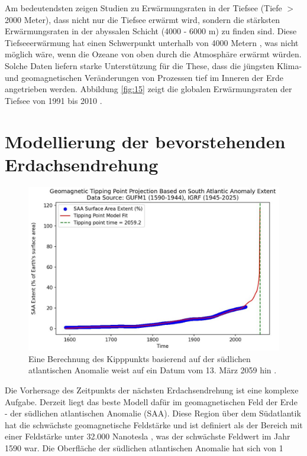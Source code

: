 \documentclass[10pt,twocolumn,letterpaper]{article}
\begin{document}
Am bedeutendsten zeigen Studien zu Erwärmungsraten in der Tiefsee (Tiefe $>$2000 Meter), dass nicht nur die Tiefsee erwärmt wird, sondern die stärksten Erwärmungsraten in der abyssalen Schicht (4000 - 6000 m) zu finden sind. Diese Tiefseeerwärmung hat einen Schwerpunkt unterhalb von 4000 Metern \cite{132,129}, was nicht möglich wäre, wenn die Ozeane von oben durch die Atmosphäre erwärmt würden. Solche Daten liefern starke Unterstützung für die These, dass die jüngsten Klima- und geomagnetischen Veränderungen von Prozessen tief im Inneren der Erde angetrieben werden. Abbildung \ref{fig:15} zeigt die globalen Erwärmungsraten der Tiefsee von 1991 bis 2010 \cite{132}.

\section{Modellierung der bevorstehenden Erdachsendrehung}

\begin{figure}[b]
\begin{center}
   \includegraphics[width=1\linewidth]{saa-crop.jpeg}
\end{center}
   \caption{Eine Berechnung des Kipppunkts basierend auf der südlichen atlantischen Anomalie weist auf ein Datum vom 13. März 2059 hin \cite{125,126}.}
\label{fig:16}
\label{fig:onecol}
\end{figure}

Die Vorhersage des Zeitpunkts der nächsten Erdachsendrehung ist eine komplexe Aufgabe. Derzeit liegt das beste Modell dafür im geomagnetischen Feld der Erde - der südlichen atlantischen Anomalie (SAA). Diese Region über dem Südatlantik hat die schwächste geomagnetische Feldstärke und ist definiert als der Bereich mit einer Feldstärke unter 32.000 Nanotesla \cite{135}, was der schwächste Feldwert im Jahr 1590 war. Die Oberfläche der südlichen atlantischen Anomalie hat sich von 1 %
\end{document}
